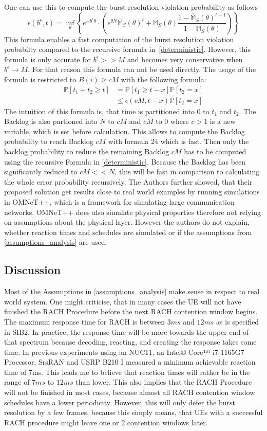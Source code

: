 \documentclass[conference]{IEEEtran}
\begin{document}
One can use this to compute the burst resolution violation probability as follows
\[\epsilon(b^\epsilon, t) = \inf_{\theta}\left\{e^{-b^\epsilon \theta} \cdot (e^{\theta N}\overline{\mathds{M}}_S(\theta)^t+\overline{\mathds{M}}_S(\theta)\frac{1-\overline{\mathds{M}}_S(\theta)^{t-1}}{1-\overline{\mathds{M}}_S(\theta)})\right\}\]
This formula enables a fast computation of the burst resolution violation probabilty compared to the recursive formula in~\ref{deterministic}.
However, this formula is only accurate for $b^\epsilon>>M$ and becomes very conservative when $b^\epsilon\rightarrow M$.
For that reason this formula can not be used directly.
The usage of the formula is restricted to $B(i) \geq cM$ with the following formula:
\begin{align*}
    \mathds{P}[t_1+t_2\geq t]&= \mathds{P}[t_1\geq t-x]\mathds{P}[t_2 = x]\\
    &\leq \epsilon(cM, t-x) \mathds{P}[t_2 = x]
\end{align*}
The intuition of this formula is, that time is partitioned into 0 to $t_1$ and $t_2$.
The Backlog is also partioned into $N$ to $cM$ and $cM$ to $0$ where $c >1$ is a new variable, which is set before calculation.
This allows to compute the Backlog probability to reach Backlog $cM$ with formula 24 which is fast.
Then only the backlog probability to reduce the remaining Backlog $cM$ has to be computed using the recursive Formula in \ref{deterministic}.
Because the Backlog has been significantly reduced to $cM << N$, this will be fast in comparison to calculating the whole error probability recursively.
The Authors further showed, that their proposed solution get results close to real world examples by running simulations in OMNeT++, which is a framework for simulating large communication networks.
OMNeT++ does also simulate physical properties therefore not relying on assumptions about the physical layer.
However the authors do not explain, whether reaction times and schedules are simulated or if the assumptions from \ref{assumptions_analysis} are used.
\subsection{Discussion}
Most of the Assumptions in \ref{assumptions_analysis} make sense in respect to real world system.
One might criticise, that in many cases the UE will not have finished the RACH Procedure before the next RACH contention window begins.
The maximum response time for RACH is between $3ms$ and $12ms$ as is specified in SIB2.
In practice, the response time will be more towards the upper end of that spectrum because decoding, reacting, and creating the response takes some time.
In previous experiments using an NUC11, an Intel® Core™ i7-1165G7 Processor, SrsRAN and USRP B210 I measured a minimum achievable reaction time of 7ms.
This leads me to believe that reaction times will rather be in the range of $7ms$ to $12ms$ than lower.
This also implies that the RACH Procedure will not be finished in most cases, because almost all RACH contention window schedules have a lower periodicity.
However, this will only defer the burst resolution by a few frames, because this simply means, that UEs with a successful RACH procedure might leave one or 2 contention windows later.
\end{document}
